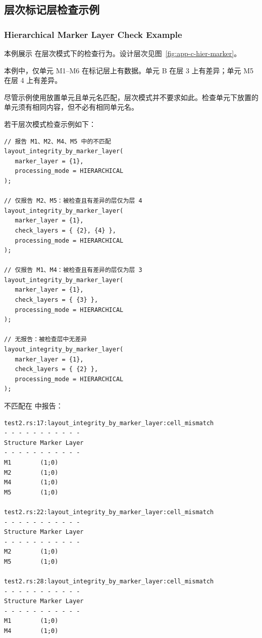 \subsection{层次标记层检查示例}
\subsubsection*{Hierarchical Marker Layer Check Example}

本例展示  在层次模式下的检查行为。设计层次见图~\ref{fig:app-c-hier-marker}。


本例中，仅单元 M1--M6 在标记层上有数据。单元 B 在层 3 上有差异；单元 M5 在层 4 上有差异。

\begin{noteBox}
尽管示例使用放置单元且单元名匹配，层次模式并不要求如此。检查单元下放置的单元须有相同内容，但不必有相同单元名。
\end{noteBox}

若干层次模式检查示例如下：

\begin{lstlisting}[style=pxl]
// 报告 M1、M2、M4、M5 中的不匹配
layout_integrity_by_marker_layer(
   marker_layer = {1},
   processing_mode = HIERARCHICAL
);

// 仅报告 M2、M5：被检查且有差异的层仅为层 4
layout_integrity_by_marker_layer(
   marker_layer = {1},
   check_layers = { {2}, {4} },
   processing_mode = HIERARCHICAL
);

// 仅报告 M1、M4：被检查且有差异的层仅为层 3
layout_integrity_by_marker_layer(
   marker_layer = {1},
   check_layers = { {3} },
   processing_mode = HIERARCHICAL
);

// 无报告：被检查层中无差异
layout_integrity_by_marker_layer(
   marker_layer = {1},
   check_layers = { {2} },
   processing_mode = HIERARCHICAL
);
\end{lstlisting}

不匹配在  中报告：

\begin{lstlisting}
test2.rs:17:layout_integrity_by_marker_layer:cell_mismatch
- - - - - - - - - - -
Structure Marker Layer
- - - - - - - - - - -
M1        (1;0)
M2        (1;0)
M4        (1;0)
M5        (1;0)

test2.rs:22:layout_integrity_by_marker_layer:cell_mismatch
- - - - - - - - - - -
Structure Marker Layer
- - - - - - - - - - -
M2        (1;0)
M5        (1;0)

test2.rs:28:layout_integrity_by_marker_layer:cell_mismatch
- - - - - - - - - - -
Structure Marker Layer
- - - - - - - - - - -
M1        (1;0)
M4        (1;0)
\end{lstlisting}

